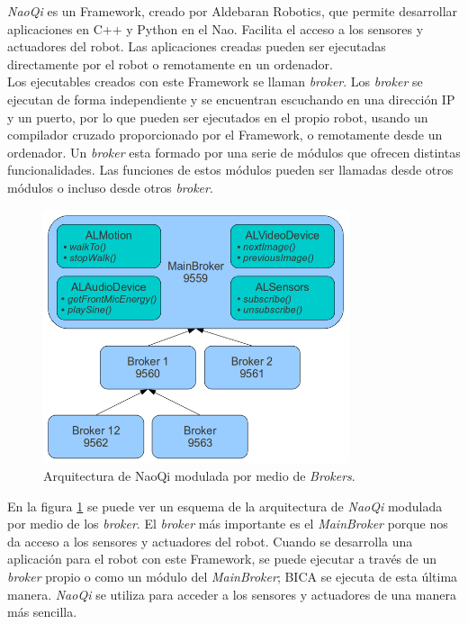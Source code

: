 \textit{NaoQi} es un Framework, creado por Aldebaran Robotics, que permite desarrollar aplicaciones en C++ y Python en el Nao. Facilita el acceso a los sensores y actuadores del robot. Las aplicaciones creadas pueden ser ejecutadas directamente por el robot o remotamente en un ordenador.\\

Los ejecutables creados con este Framework se llaman \textit{broker}. Los \textit{broker} se ejecutan de forma independiente y se encuentran escuchando en una dirección IP y un puerto, por lo que pueden ser ejecutados en el propio robot, usando un compilador cruzado proporcionado por el Framework, o remotamente desde un ordenador. Un \textit{broker} esta formado por una serie de módulos que ofrecen distintas funcionalidades. Las funciones de estos módulos pueden ser llamadas desde otros módulos o incluso desde otros \textit{broker}.\\

\begin{figure} [h]
  \begin{center}
    \includegraphics[width=9cm]{img/cap3/broker-naoqi}
  \end{center}
  \caption{Arquitectura de NaoQi modulada por medio de \textit{Brokers}.}
  \label{fig:broker-naoqi}
\end{figure}

En la figura \ref{fig:broker-naoqi} se puede ver un esquema de la arquitectura de \textit{NaoQi} modulada por medio de los \textit{broker}. El \textit{broker} más importante es el \textit{MainBroker} porque nos da acceso a los sensores y actuadores del robot. Cuando se desarrolla una aplicación para el robot con este Framework, se puede ejecutar a través de un \textit{broker} propio o como un módulo del \textit{MainBroker}; BICA se ejecuta de esta última manera. \textit{NaoQi} se utiliza para acceder a los sensores y actuadores de una manera más sencilla.\\

